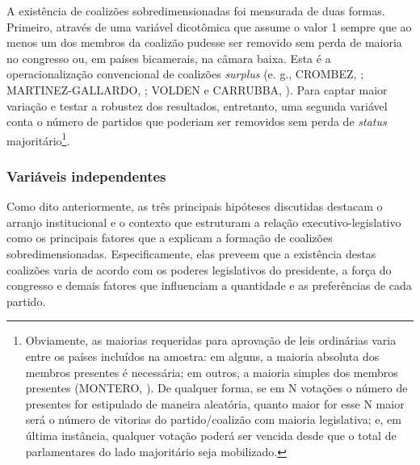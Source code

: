 A existência de coalizões sobredimensionadas foi mensurada de duas formas. Primeiro, através de uma variável dicotômica que assume o valor 1 sempre que ao menos um dos membros da coalizão pudesse ser removido sem perda de maioria no congresso ou, em países bicamerais, na câmara baixa. Esta é a operacionalização convencional de coalizões \textit{surplus} (e. g., CROMBEZ, \citeyear{crombez1996}; MARTINEZ-GALLARDO, \citeyear{martinez2012}; VOLDEN e CARRUBBA, \citeyear{volden2004}). Para captar maior variação e testar a robustez dos resultados, entretanto, uma segunda variável conta o número de partidos que poderiam ser removidos sem perda de \textit{status} majoritário\footnote{Obviamente, as maiorias requeridas para aprovação de leis ordinárias varia entre os países incluídos na amostra: em alguns, a maioria absoluta dos membros presentes é necessária; em outros, a maioria simples dos membros presentes (MONTERO, \citeyear{montero2013}). De qualquer forma, se em N votações o número de presentes for estipulado de maneira aleatória, quanto maior for esse N maior será o número de vitorias do partido/coalizão com maioria legislativa; e, em última instância, qualquer votação poderá ser vencida desde que o total de parlamentares do lado majoritário seja mobilizado.}.

\subsubsection{Variáveis independentes}

Como dito anteriormente, as três principais hipóteses discutidas destacam o arranjo institucional e o contexto que estruturam a relação executivo-legislativo como os principais fatores que a explicam a formação de coalizões sobredimensionadas. Especificamente, elas preveem que a existência destas coalizões varia de acordo com os poderes legislativos do presidente, a força do congresso e demais fatores que influenciam a quantidade e as preferências de cada partido.

